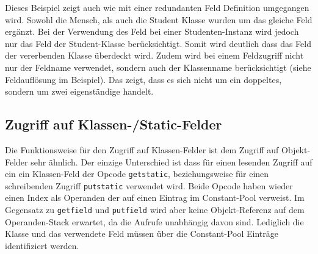 \documentclass[conference]{IEEEtran}
\begin{document}
Dieses Beispiel zeigt auch wie mit einer redundanten Feld Definition umgegangen wird. Sowohl die Mensch, als auch die Student Klasse wurden um das gleiche Feld ergänzt. Bei der Verwendung des Feld bei einer Studenten-Instanz wird jedoch nur das Feld der Student-Klasse berücksichtigt. Somit wird deutlich dass das Feld der vererbenden Klasse überdeckt wird. Zudem wird bei einem Feldzugriff nicht nur der Feldname verwendet, sondern auch der Klassenname berücksichtigt (siehe Feldauflösung im Beispiel). Das zeigt, dass es sich nicht um ein doppeltes, sondern um zwei eigenständige handelt. \cite{Venners.1996}


\subsection{Zugriff auf Klassen-/Static-Felder}
Die Funktionsweise für den Zugriff auf Klassen-Felder ist dem Zugriff auf Objekt-Felder sehr ähnlich. Der einzige Unterschied ist dass für einen lesenden Zugriff auf ein ein Klassen-Feld der Opcode \verb|getstatic|, beziehungsweise für einen schreibenden Zugriff \verb|putstatic| verwendet wird. Beide Opcode haben wieder einen Index als Operanden der auf einen Eintrag im Constant-Pool verweist. Im Gegensatz zu \verb|getfield| und \verb|putfield| wird aber keine Objekt-Referenz auf dem Operanden-Stack erwartet, da die Aufrufe unabhängig davon sind. Lediglich die Klasse und das verwendete Feld müssen über die Constant-Pool Einträge identifiziert werden.
\end{document}
